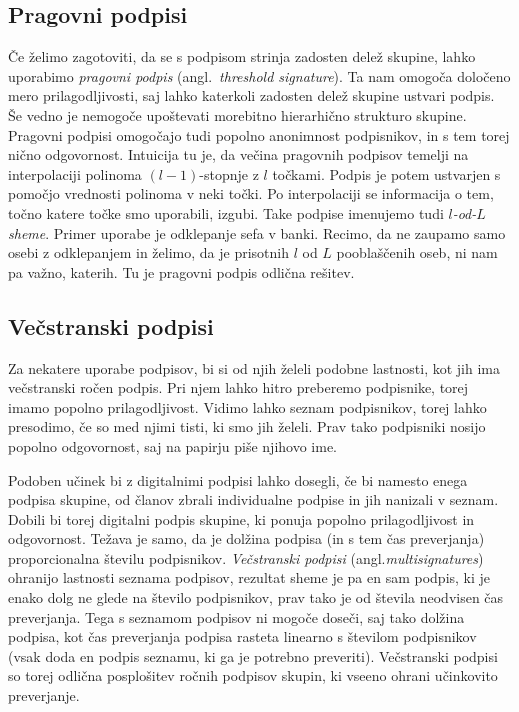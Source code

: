 \documentclass[isrm2, tisk]{fmfdelo}
\begin{document}
\subsection{Pragovni podpisi}
Če želimo zagotoviti, da se s podpisom strinja zadosten delež skupine, lahko uporabimo \textit{pragovni 
podpis} (angl.\ \textit{threshold signature}). Ta nam omogoča določeno mero prilagodljivosti, saj lahko 
katerkoli zadosten delež skupine ustvari podpis. Še vedno je nemogoče upoštevati morebitno hierarhično
strukturo skupine. Pragovni podpisi omogočajo tudi popolno anonimnost podpisnikov, in s tem torej 
nično odgovornost. Intuicija tu je, da večina pragovnih podpisov temelji na interpolaciji polinoma 
$(l - 1)$-stopnje z $l$ točkami. Podpis je potem ustvarjen s pomočjo vrednosti polinoma v neki točki. 
Po interpolaciji se informacija o tem, točno katere točke smo uporabili, izgubi. Take podpise imenujemo 
tudi \textit{$l$-od-$L$ sheme}. Primer uporabe je odklepanje sefa v banki. Recimo, da ne zaupamo samo 
osebi z odklepanjem in želimo, da je prisotnih $l$ od $L$ pooblaščenih oseb, ni nam pa važno, katerih. 
Tu je pragovni podpis odlična rešitev.

\subsection{Večstranski podpisi}
\label{sec:multisig}
Za nekatere uporabe podpisov, bi si od njih želeli podobne lastnosti, kot jih ima večstranski ročen podpis. 
Pri njem lahko hitro preberemo podpisnike, torej imamo popolno prilagodljivost. Vidimo lahko seznam 
podpisnikov, torej lahko presodimo, če so med njimi tisti, ki smo jih želeli. Prav tako podpisniki nosijo 
popolno odgovornost, saj na papirju piše njihovo ime. 

Podoben učinek bi z digitalnimi podpisi lahko dosegli, če bi namesto enega podpisa skupine, od članov 
zbrali individualne podpise in jih nanizali v seznam. Dobili bi torej digitalni podpis skupine, ki 
ponuja popolno prilagodljivost in odgovornost. Težava je samo, da je dolžina podpisa (in s tem čas 
preverjanja) proporcionalna številu podpisnikov. \textit{Večstranski podpisi} (angl.\textit{multisignatures})
ohranijo lastnosti seznama podpisov, rezultat sheme je pa en sam podpis, ki je enako dolg ne glede 
na število podpisnikov, prav tako je od števila neodvisen čas preverjanja. Tega s seznamom podpisov 
ni mogoče doseči, saj tako dolžina podpisa, kot čas preverjanja podpisa rasteta linearno s številom 
podpisnikov (vsak doda en podpis seznamu, ki ga je potrebno preveriti). Večstranski podpisi so torej 
odlična posplošitev ročnih podpisov skupin, ki vseeno ohrani učinkovito preverjanje.
\end{document}
